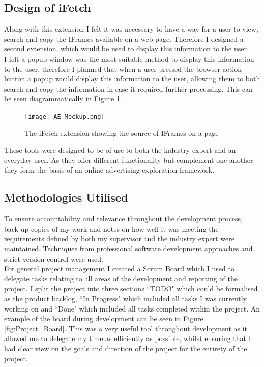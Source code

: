 \documentclass[12pt]{article}
\begin{document}
\subsection{Design of iFetch}
Along with this extension I felt it was necessary to have a way for a user to view, search and copy the IFrames available on a web page. Therefore I designed a second extension, which would be used to display this information to the user. \\

I felt a popup window was the most suitable method to display this information to the user, therefore I planned that when a user pressed the browser action button a popup would display this information to the user, allowing them to both search and copy the information in case it required further processing. This can be seen diagrammatically in Figure \ref{fig:AE_Mockup}.

\begin{figure}[H]
    \centering
    \texttt{[image: AE\_Mockup.png]}
    \caption{The iFetch extension showing the source of IFrames on a page}
    \label{fig:AE_Mockup}
\end{figure}

These tools were designed to be of use to both the industry expert and an everyday user. As they offer different functionality but complement one another they form the basis of an online advertising exploration framework. 

\subsection{Methodologies Utilised}
To ensure accountability and relevance throughout the development process, back-up copies of my work and notes on how well it was meeting the requirements defined by both my supervisor and the industry expert were maintained. Techniques from professional software development approaches and strict version control were used. \\

For general project management I created a Scrum Board which I used to delegate tasks relating to all areas of the development and reporting of the project. I split the project into three sections ``TODO" which could be formalised as the product backlog, ``In Progress" which included all tasks I was currently working on and ``Done" which included all tasks completed within the project. An example of the board during development can be seen in Figure \ref{fig:Project_Board}. This was a very useful tool throughout development as it allowed me to delegate my time as efficiently as possible, whilst ensuring that I had clear view on the goals and direction of the project for the entirety of the project.
\end{document}
